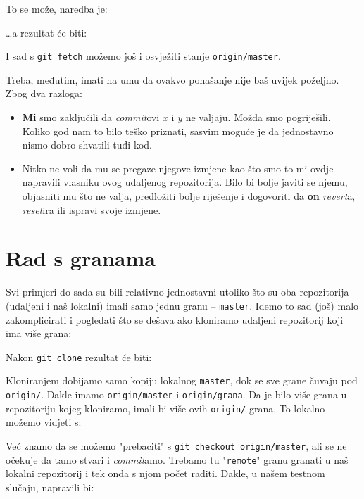To se može, naredba je:


\dots{}a rezultat će biti:



I sad s \verb+git fetch+ možemo još i osvježiti stanje \verb+origin/master+.

Treba, međutim, imati na umu da ovakvo ponašanje nije baš uvijek poželjno. 
Zbog dva razloga:

\begin{itemize}
	\item \textbf{Mi} smo zaključili da \emph{commit}ovi $x$ i $y$ ne valjaju. Možda smo pogriješili. Koliko god nam to bilo teško priznati, sasvim moguće je da jednostavno nismo dobro shvatili tuđi kod.
	\item Nitko ne voli da mu se pregaze njegove izmjene kao što smo to mi ovdje napravili vlasniku ovog udaljenog repozitorija. Bilo bi bolje javiti se njemu, objasniti mu što ne valja, predložiti bolje riješenje i dogovoriti da \textbf{on} \emph{revert}a, \emph{reset}ira ili ispravi svoje izmjene.
\end{itemize}

\section*{Rad s granama}

Svi primjeri do sada su bili relativno jednostavni utoliko što su oba repozitorija (udaljeni i naš lokalni) imali samo jednu granu -- \verb+master+.
Idemo to sad (još) malo zakomplicirati i pogledati što se dešava ako kloniramo udaljeni repozitorij koji ima više grana:

Nakon \verb+git clone+ rezultat će biti:



Kloniranjem dobijamo samo kopiju lokalnog \verb+master+, dok se sve grane čuvaju pod \verb+origin/+. Dakle imamo \verb+origin/master+ i \verb+origin/grana+.
Da je bilo više grana u repozitoriju kojeg kloniramo, imali bi više ovih \verb+origin/+ grana.
To lokalno možemo vidjeti s:



Već znamo da se možemo "prebaciti" s \verb+git checkout origin/master+, ali se ne očekuje da tamo stvari i \emph{commit}amo.
Trebamo tu "\verb+remote+" granu granati u naš lokalni repozitorij i tek onda s njom počet raditi.
Dakle, u našem testnom slučaju, napravili bi:

